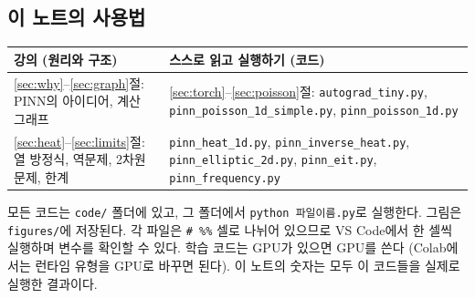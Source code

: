 \documentclass[11pt,a4paper]{article}
\begin{document}
\subsection*{이 노트의 사용법}

\begin{center}
\begin{tabular}{@{}p{65mm}p{75mm}@{}}
\toprule
강의 (원리와 구조) & 스스로 읽고 실행하기 (코드) \\
\midrule
\ref{sec:why}--\ref{sec:graph}절: PINN의 아이디어, 계산 그래프 & \ref{sec:torch}--\ref{sec:poisson}절: \texttt{autograd\_tiny.py}, \texttt{pinn\_poisson\_1d\_simple.py}, \texttt{pinn\_poisson\_1d.py} \\
\ref{sec:heat}--\ref{sec:limits}절: 열 방정식, 역문제, 2차원 문제, 한계 & \texttt{pinn\_heat\_1d.py}, \texttt{pinn\_inverse\_heat.py}, \texttt{pinn\_elliptic\_2d.py}, \texttt{pinn\_eit.py}, \texttt{pinn\_frequency.py} \\
\bottomrule
\end{tabular}
\end{center}

모든 코드는 \texttt{code/} 폴더에 있고, 그 폴더에서 \texttt{python 파일이름.py}로 실행한다.
그림은 \texttt{figures/}에 저장된다. 각 파일은 \texttt{\# \%\%} 셀로 나뉘어 있으므로 VS Code에서 한 셀씩 실행하며 변수를 확인할 수 있다.
학습 코드는 GPU가 있으면 GPU를 쓴다 (Colab에서는 런타임 유형을 GPU로 바꾸면 된다).
이 노트의 숫자는 모두 이 코드들을 실제로 실행한 결과이다.
\end{document}
